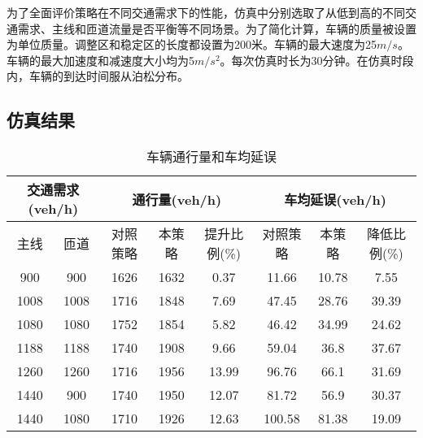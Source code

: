 为了全面评价策略在不同交通需求下的性能，仿真中分别选取了从低到高的不同交通需求、主线和匝道流量是否平衡等不同场景。为了简化计算，车辆的质量被设置为单位质量。调整区和稳定区的长度都设置为200米。车辆的最大速度为25$m/s$。车辆的最大加速度和减速度大小均为5$m/s^2$。每次仿真时长为30分钟。在仿真时段内，车辆的到达时间服从泊松分布。

\subsection{仿真结果}
\begin{table}[]
    \begin{tabular}{cccccccc}
        \hline
        \multicolumn{2}{c}{交通需求(veh/h)} & \multicolumn{3}{c}{通行量(veh/h)} & \multicolumn{3}{c}{车均延误(veh/h)}                                                            \\ \hline
        主线                                & 匝道                              & 对照策略                            & 本策略 & 提升比例(\%) & 对照策略 & 本策略 & 降低比例(\%) \\ \hline
        900                                 & 900                               & 1626                                & 1632   & 0.37         & 11.66    & 10.78  & 7.55         \\
        1008                                & 1008                              & 1716                                & 1848   & 7.69         & 47.45    & 28.76  & 39.39        \\
        1080                                & 1080                              & 1752                                & 1854   & 5.82         & 46.42    & 34.99  & 24.62        \\
        1188                                & 1188                              & 1740                                & 1908   & 9.66         & 59.04    & 36.8   & 37.67        \\
        1260                                & 1260                              & 1716                                & 1956   & 13.99        & 96.76    & 66.1   & 31.69        \\ \hline
        1440                                & 900                               & 1740                                & 1950   & 12.07        & 81.72    & 56.9   & 30.37        \\
        1440                                & 1080                              & 1710                                & 1926   & 12.63        & 100.58   & 81.38  & 19.09        \\
        \hline
    \end{tabular}
    \caption{车辆通行量和车均延误}
    \label{tab:sim_res}
\end{table}

